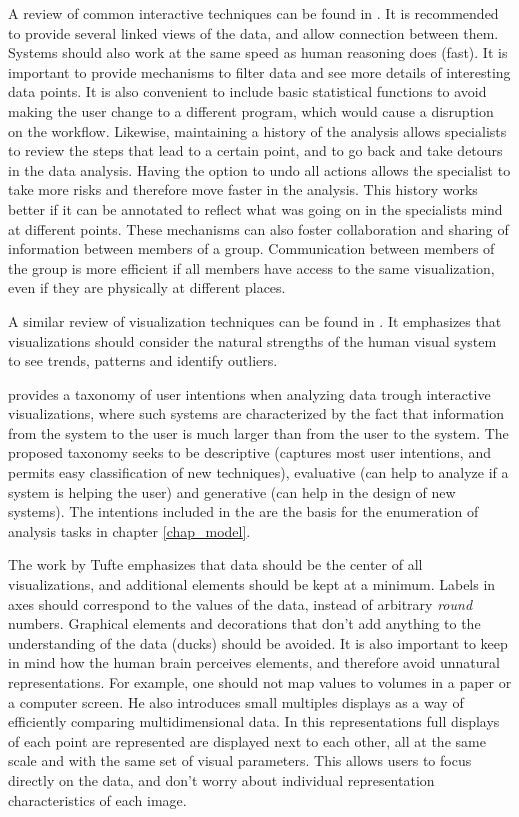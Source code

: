 A review of common interactive techniques can be found in \autocite{heer_interactive_2012}. It is recommended to provide several linked views of the data, and allow connection between them. Systems should also work at the same speed as human reasoning does (fast). It is important to provide mechanisms to filter data and see more details of interesting data points. It is also convenient to include basic statistical functions to avoid making the user change to a different program, which would cause a disruption on the workflow. Likewise, maintaining a history of the analysis allows specialists to review the steps that lead to a certain point, and to go back and take detours in the data analysis. Having the option to undo all actions allows the specialist to take more risks and therefore move faster in the analysis. This history works better if it can be annotated to reflect what was going on in the specialists mind at different points. These mechanisms can also foster collaboration and sharing of information between members of a group. Communication between members of the group is more efficient if all members have access to the same visualization, even if they are physically at different places.

A similar review of visualization techniques can be found in \autocite{heer_tour_2010}. It emphasizes that visualizations should consider the natural strengths of the human visual system to see trends, patterns and identify outliers.



\autocite{yi_toward_2007} provides a taxonomy of user intentions when analyzing data trough interactive visualizations, where such systems are characterized by the fact that information from the system to the user is much larger than from the user to the system. The proposed taxonomy seeks to be descriptive (captures most user intentions, and permits easy classification of new techniques), evaluative (can help to analyze if a system is helping the user) and generative (can help in the design of new systems). The intentions included in the are the basis for the enumeration of analysis tasks in chapter \ref{chap_model}.


The work by Tufte \autocite{tufte_visual_1983} emphasizes that data should be the center of all visualizations, and additional elements should be kept at a minimum. Labels in axes should correspond to the values of the data, instead of arbitrary \emph{round} numbers. Graphical elements and decorations that don't add anything to the understanding of the data (ducks) should be avoided. It is also important to keep in mind how the human brain perceives elements, and therefore avoid unnatural representations. For example, one should not map values to volumes in a paper or a computer screen. He also introduces small multiples displays as a way of efficiently comparing multidimensional data. In this representations full displays of each point are represented are displayed next to each other, all at the same scale and with the same set of visual parameters. This allows users to focus directly on the data, and don't worry about individual representation characteristics of each image.


